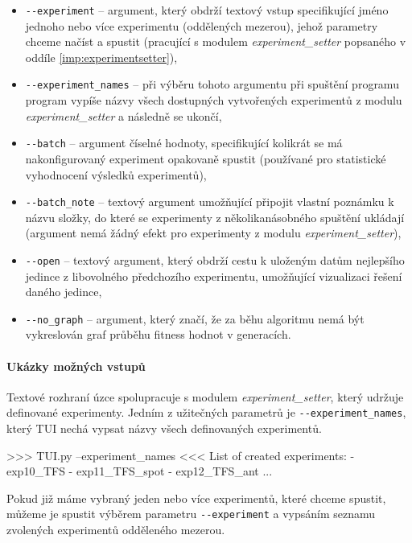 \begin{itemize}
    \item \texttt{-{}-experiment} -- argument, který obdrží textový vstup
        specifikující jméno jednoho nebo více experimentu (oddělených mezerou),
        jehož parametry chceme načíst a spustit (pracující s modulem
        \emph{experiment\_setter} popsaného v oddíle
        \ref{imp:experimentsetter}),
    \item \texttt{-{}-experiment\_names} -- při výběru tohoto argumentu při
        spuštění programu program vypíše názvy všech dostupných vytvořených
        experimentů z modulu \emph{experiment\_setter} a následně se ukončí,
    \item \texttt{-{}-batch} -- argument číselné hodnoty, specifikující
        kolikrát se má nakonfigurovaný experiment opakovaně spustit (používané
        pro statistické vyhodnocení výsledků experimentů),
    \item \texttt{-{}-batch\_note} -- textový argument umožňující připojit
        vlastní poznámku k názvu složky, do které se experimenty z
        několikanásobného spuštění ukládají (argument nemá žádný efekt pro
        experimenty z modulu \emph{experiment\_setter}),
    \item \texttt{-{}-open} -- textový argument, který obdrží cestu k uloženým
        datům nejlepšího jedince z libovolného předchozího experimentu,
        umožňující vizualizaci řešení daného jedince,
    \item \texttt{-{}-no\_graph} -- argument, který značí, že za běhu algoritmu
        nemá být vykreslován graf průběhu fitness hodnot v
        generacích.
\end{itemize}

\paragraph{Ukázky možných vstupů}
Textové rozhraní úzce spolupracuje s modulem \emph{experiment\_setter}, který
udržuje definované experimenty. Jedním z užitečných parametrů je
\texttt{-{}-experiment\_names}, který TUI nechá vypsat názvy všech definovaných
experimentů.

\begin{code}
>>> TUI.py --experiment_names
<<< List of created experiments:
     - exp10_TFS
     - exp11_TFS_spot
     - exp12_TFS_ant
     ...
\end{code}

Pokud již máme vybraný jeden nebo více experimentů, které chceme spustit,
můžeme je spustit výběrem parametru \texttt{-{}-experiment} a vypsáním seznamu 
zvolených experimentů odděleného mezerou.

